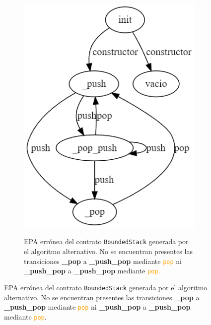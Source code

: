 \begin{figure}[H]
\begin{subfigure}{0.4\textwidth}
        \label{fig:bounded-stack-epa}
    \end{subfigure}
    \hfill
    \begin{subfigure}{0.4\textwidth}
        {\includegraphics[width=\textwidth]{figs/bonded-stack-bad-epa.png}}
        \caption{EPA errónea del contrato \texttt{BoundedStack} generada por el algoritmo alternativo.
            No se encuentran presentes las transiciones \textbf{\_pop} a \textbf{\_push\_pop} mediante \textcolor{orange}{\texttt{pop}} ni \textbf{\_push\_pop} a \textbf{\_push\_pop} mediante \textcolor{orange}{\texttt{pop}}.}
        \label{fig:bounded-stack-bad-epa}
    \end{subfigure}
\end{figure}

